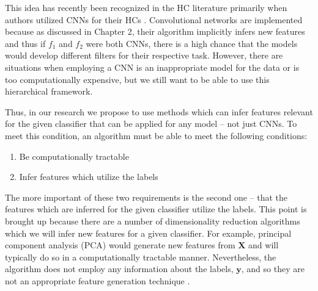 \documentclass[../thesis.tex]{subfiles}
\begin{document}
This idea has recently been recognized in the HC literature primarily when authors utilized CNNs for their HCs \cite{yan2015hd} \cite{wang2018learning}. Convolutional networks are implemented because as discussed in Chapter 2, their algorithm implicitly infers new features and thus if $f_1$ and $f_2$ were both CNNs, there is a high chance that the models would develop different filters for their respective task. However, there are situations when employing a CNN is an inappropriate model for the data or is too computationally expensive, but we still want to be able to use this hierarchical framework. 

Thus, in our research we propose to use methods which can infer features relevant for the given classifier that can be applied for any model -- not just CNNs. To meet this condition, an algorithm must be able to meet the following conditions:
\begin{enumerate}
    \item Be computationally tractable
    \item Infer features which utilize the labels
\end{enumerate}
The more important of these two requirements is the second one -- that the features which are inferred for the given classifier utilize the labels. This point is brought up because there are a number of dimensionality reduction algorithms which we will infer new features for a given classifier. For example, principal component analysis (PCA) would generate new features from $\mathbf{X}$ and will typically do so in a computationally tractable manner. Nevertheless, the algorithm does not employ any information about the labels, $\mathbf{y}$, and so they are not an appropriate feature generation technique \cite{jolliffe2011principal}.
\end{document}
